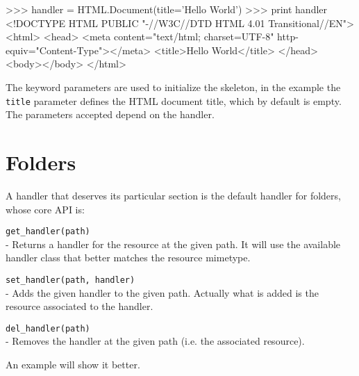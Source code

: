 \begin{code}
    >>> handler = HTML.Document(title='Hello World')
    >>> print handler
    <!DOCTYPE HTML PUBLIC "-//W3C//DTD HTML 4.01 Transitional//EN">
    <html>
      <head>
        <meta content="text/html; charset=UTF-8" http-equiv="Content-Type"></meta>
        <title>Hello World</title>
      </head>
      <body></body>
    </html>
\end{code}

The keyword parameters are used to initialize the skeleton, in the example
the {\tt title} parameter defines the HTML document title, which by default
is empty. The parameters accepted depend on the handler.



\section{Folders}

A handler that deserves its particular section is the default handler for
folders, whose core API is:

\begin{api}
  {\tt get\_handler(path)}\\
  - Returns a handler for the resource at the given path. It will use the
    available handler class that better matches the resource mimetype.

  {\tt set\_handler(path, handler)}\\
  - Adds the given handler to the given path. Actually what is added is
    the resource associated to the handler.

  {\tt del\_handler(path)}\\
  - Removes the handler at the given path (i.e. the associated resource).
\end{api}

An example will show it better.


